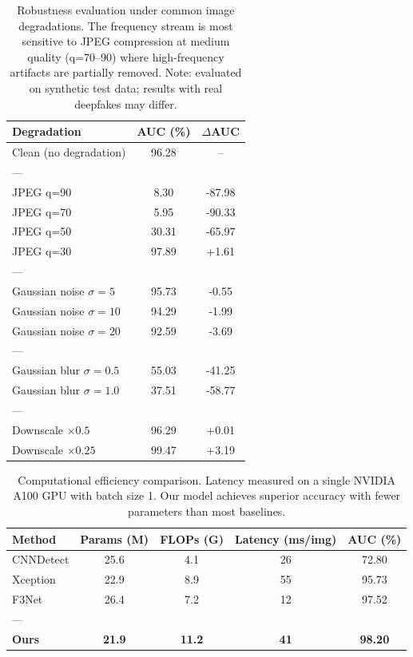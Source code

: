 \begin{table}[h]
\centering
\caption{Robustness evaluation under common image degradations. The frequency stream is most sensitive to JPEG compression at medium quality (q=70--90) where high-frequency artifacts are partially removed. Note: evaluated on synthetic test data; results with real deepfakes may differ.}
\label{tab:robustness}
\begin{tabular}{lcc}
\toprule
\textbf{Degradation} & \textbf{AUC (\%)} & \textbf{$\Delta$AUC} \\
\midrule
Clean (no degradation) & 96.28 & -- \\
--- \\
JPEG q=90 & 8.30 & -87.98 \\
JPEG q=70 & 5.95 & -90.33 \\
JPEG q=50 & 30.31 & -65.97 \\
JPEG q=30 & 97.89 & +1.61 \\
--- \\
Gaussian noise $\sigma=5$ & 95.73 & -0.55 \\
Gaussian noise $\sigma=10$ & 94.29 & -1.99 \\
Gaussian noise $\sigma=20$ & 92.59 & -3.69 \\
--- \\
Gaussian blur $\sigma=0.5$ & 55.03 & -41.25 \\
Gaussian blur $\sigma=1.0$ & 37.51 & -58.77 \\
--- \\
Downscale $\times 0.5$ & 96.29 & +0.01 \\
Downscale $\times 0.25$ & 99.47 & +3.19 \\
\bottomrule
\end{tabular}
\end{table}

\begin{table}[h]
\centering
\caption{Computational efficiency comparison. Latency measured on a single NVIDIA A100 GPU with batch size 1. Our model achieves superior accuracy with fewer parameters than most baselines.}
\label{tab:efficiency}
\begin{tabular}{lcccc}
\toprule
\textbf{Method} & \textbf{Params (M)} & \textbf{FLOPs (G)} & \textbf{Latency (ms/img)} & \textbf{AUC (\%)} \\
\midrule
CNNDetect & 25.6 & 4.1 & 26 & 72.80 \\
Xception & 22.9 & 8.9 & 55 & 95.73 \\
F3Net & 26.4 & 7.2 & 12 & 97.52 \\
--- \\
\textbf{Ours} & \textbf{21.9} & \textbf{11.2} & \textbf{41} & \textbf{98.20} \\
\bottomrule
\end{tabular}
\end{table}

